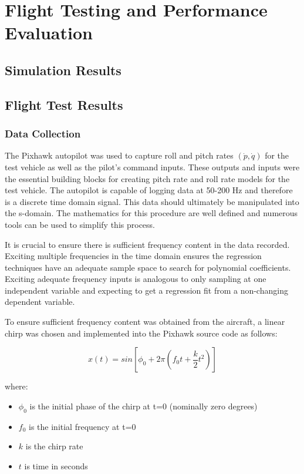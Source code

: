 \chapter{Flight Testing and Performance Evaluation}\label{ch:performance}

\section{Simulation Results}

\section{Flight Test Results}

\subsection{Data Collection}
The Pixhawk autopilot was used to capture roll and pitch rates $(\dot{p},\dot{q})$ for the test vehicle as well as the pilot's command inputs.  These outputs and inputs were the essential building blocks for creating pitch rate and roll rate models for the test vehicle.  The autopilot is capable of logging data at 50-200 Hz and therefore is a discrete time domain signal.  This data should ultimately be manipulated into the s-domain.  The mathematics for this procedure are well defined and numerous tools can be used to simplify this process.  

It is crucial to ensure there is sufficient frequency content in the data recorded.  Exciting multiple frequencies in the time domain ensures the regression techniques have an adequate sample space to search for polynomial coefficients.  Exciting adequate frequency inputs is analogous to only sampling at one independent variable and expecting to get a regression fit from a non-changing dependent variable.  

To ensure sufficient frequency content was obtained from the aircraft, a linear chirp was chosen and implemented into the Pixhawk source code as follows:

\begin{equation}
x(t)=sin\left[\phi_0+2\pi\left(f_0t+\frac{k}{2}t^2\right)\right]
\end{equation}

where:
\begin{itemize}
	\item[] $\phi_0$ is the initial phase of the chirp at t=0 (nominally zero degrees)
	\item[] $f_0$ is the initial frequency at t=0
	\item[] $k$ is the chirp rate
	\item[] $t$  is time in seconds
\end{itemize}

